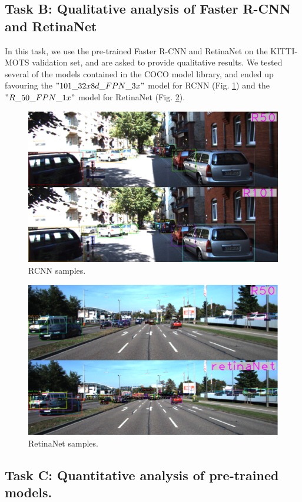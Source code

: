 \documentclass[12pt,a4paper,twocolumn,twoside]{article}
\begin{document}
\subsection{Task B: Qualitative analysis of Faster R-CNN and RetinaNet}

In this task, we use the pre-trained Faster R-CNN and RetinaNet on the
KITTI-MOTS validation set, and are asked to provide qualitative results.
We tested several of the models contained in the COCO model library, and 
ended up favouring the $"101\_32x8d\_FPN\_3x"$ model for 
RCNN (Fig. \ref{fig:r50r101}) and the $"R\_50\_FPN\_1x"$
model for RetinaNet (Fig. \ref{fig:r50retina}).

\begin{figure}[ht]
    \centering
    \includegraphics[width=0.8\linewidth]{Resources/Images/r50r101.png}
    \caption{RCNN samples.}
    \label{fig:r50r101}
    \end{figure}

\begin{figure}[ht]
    \centering
    \includegraphics[width=0.8\linewidth]{Resources/Images/r50retina.png}
    \caption{RetinaNet samples.}
    \label{fig:r50retina}
    \end{figure}

\subsection{Task C: Quantitative analysis of pre-trained models.}
\end{document}
